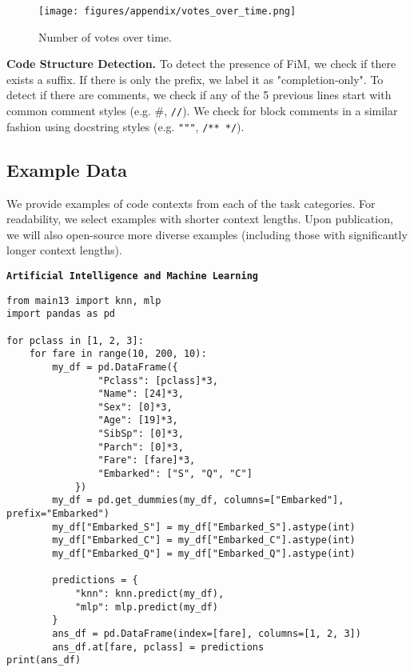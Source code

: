 \begin{figure}
    \centering
    \texttt{[image: figures/appendix/votes\_over\_time.png]}
    \caption{Number of votes over time.}
    \label{fig:enter-label}
\end{figure}



\textbf{Code Structure Detection.}
To detect the presence of FiM, we check if there exists a suffix.
If there is only the prefix, we label it as "completion-only".
To detect if there are comments, we check if any of the 5 previous lines start with common comment styles (e.g. $\#$, \texttt{//}).
We check for block comments in a similar fashion using docstring styles (e.g. \texttt{"""}, \texttt{/** */}).






\subsection{Example Data}\label{appdx:example_data}

We provide examples of code contexts from each of the task categories. For readability, we select examples with shorter context lengths. Upon publication, we will also open-source more diverse examples (including those with significantly longer context lengths).

\begin{tcolorbox}
\textbf{\texttt{Artificial Intelligence and Machine Learning}}
\begin{verbatim}
from main13 import knn, mlp
import pandas as pd

for pclass in [1, 2, 3]:
    for fare in range(10, 200, 10):
        my_df = pd.DataFrame({
                "Pclass": [pclass]*3,
                "Name": [24]*3,
                "Sex": [0]*3, 
                "Age": [19]*3,
                "SibSp": [0]*3,
                "Parch": [0]*3,
                "Fare": [fare]*3,
                "Embarked": ["S", "Q", "C"]
            })
        my_df = pd.get_dummies(my_df, columns=["Embarked"], prefix="Embarked")  
        my_df["Embarked_S"] = my_df["Embarked_S"].astype(int)
        my_df["Embarked_C"] = my_df["Embarked_C"].astype(int)
        my_df["Embarked_Q"] = my_df["Embarked_Q"].astype(int)

        predictions = {
            "knn": knn.predict(my_df),
            "mlp": mlp.predict(my_df)
        }
        ans_df = pd.DataFrame(index=[fare], columns=[1, 2, 3])
        ans_df.at[fare, pclass] = predictions
print(ans_df)

\end{verbatim}
\end{tcolorbox}

